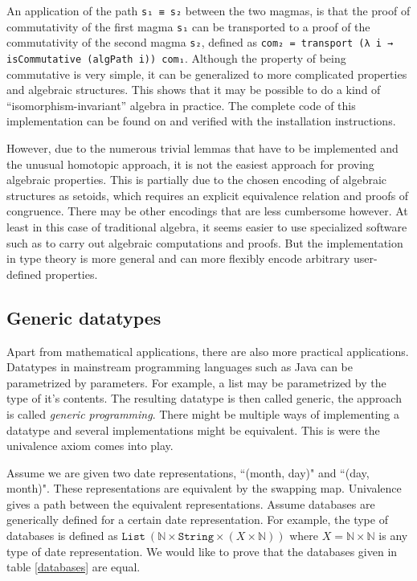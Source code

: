 \documentclass[12pt,a4paper,twoside,xetex,draft]{book}
\newcommand{\keyword}[1]{\emph{#1}\index{#1}}
\newcommand{\op}[1]{\mathtt{#1}}
\begin{document}
An application of the path \texttt{s₁ ≡ s₂} between the two magmas, is that the proof of commutativity of the first magma \texttt{s₁} can be transported to a proof of the commutativity of the second magma \texttt{s₂}, defined as \texttt{com₂ = transport (λ i → isCommutative (algPath i)) com₁}. Although the property of being commutative is very simple, it can be generalized to more complicated properties and algebraic structures. This shows that it may be possible to do a kind of ``isomorphism-invariant'' algebra in practice.  The complete code of this implementation can be found on \cite{Van19} and verified with the installation instructions.

However, due to the numerous trivial lemmas that have to be implemented and the unusual homotopic approach, it is not the easiest approach for proving algebraic properties. This is partially due to the chosen encoding of algebraic structures as setoids, which requires an explicit equivalence relation and proofs of congruence. There may be other encodings that are less cumbersome however. At least in this case of traditional algebra, it seems easier to use specialized software such as \cite{TheGAPGroup2018} to carry out algebraic computations and proofs. But the implementation in type theory is more general and can more flexibly encode arbitrary user-defined properties.

\subsection{Generic datatypes}

Apart from mathematical applications, there are also more practical applications. Datatypes in mainstream programming languages such as Java can be parametrized by parameters. For example, a list may be parametrized by the type of it's contents. The resulting datatype is then called generic, the approach is called \keyword{generic programming}. There might be multiple ways of implementing a datatype and several implementations might be equivalent. This is were the univalence axiom comes into play. 

Assume we are given two date representations, ``(month, day)" and ``(day, month)". These representations are equivalent by the swapping map. Univalence gives a path between the equivalent representations. Assume databases are generically defined for a certain date representation. For example, the type of databases is defined as $\op{List} \ (\mathbb{N} \times \op{String} \times (X \times \mathbb{N}))$ where $X = \mathbb{N} \times \mathbb{N}$ is any type of date representation. We would like to prove that the databases given in table \ref{databases} are equal.
\end{document}
